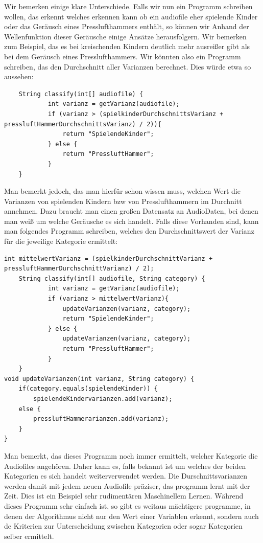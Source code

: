 \documentclass{thesisclass}
\begin{document}
Wir bemerken einige klare Unterschiede. Falls wir nun ein Programm schreiben wollen, das erkennt welches erkennen kann ob ein audiofile eher spielende Kinder oder das Geräusch eines Presslufthammers enthält, so können wir Anhand der Wellenfunktion dieser Geräusche einige Ansätze herausfolgern. Wir bemerken zum Beispiel, das es bei kreischenden Kindern deutlich mehr ausreißer gibt als bei dem Geräusch eines Presslufthammers. Wir könnten also ein Programm schreiben, das den Durchschnitt aller Varianzen berechnet.
Dies würde etwa so aussehen:
\newpage
\begin{lstlisting}
    String classify(int[] audiofile) {
        	int varianz = getVarianz(audiofile);
			if (varianz > (spielkinderDurchschnittsVarianz + pressluftHammerDurchschnittsVarianz) / 2)){
				return "SpielendeKinder";
			} else {
				return "PressluftHammer";
			}
    }   
\end{lstlisting}

Man bemerkt jedoch, das man hierfür schon wissen muss, welchen Wert die Varianzen von spielenden Kindern bzw von Presslufthammern im Durchnitt annehmen. Dazu braucht man einen großen Datensatz an AudioDaten, bei denen man weiß um welche Geräusche es sich handelt. Falls diese Vorhanden sind, kann man folgendes Programm schreiben, welches den Durchschnittswert der Varianz für die jeweilige Kategorie ermittelt:

\begin{lstlisting}
int mittelwertVarianz = (spielkinderDurchschnittVarianz + pressluftHammerDurchschnittVarianz) / 2);
    String classify(int[] audiofile, String category) {
        	int varianz = getVarianz(audiofile);
			if (varianz > mittelwertVarianz){
				updateVarianzen(varianz, category);				
				return "SpielendeKinder";
			} else {
				updateVarianzen(varianz, category);
				return "PressluftHammer";
			}
    }   
void updateVarianzen(int varianz, String category) {
	if(category.equals(spielendeKinder)) {
		spielendeKindervarianzen.add(varianz);
	else {
		pressluftHammerarianzen.add(varianz);
	}
}
\end{lstlisting}

Man bemerkt, das dieses Programm noch immer ermittelt, welcher Kategorie die Audiofiles angehören. Daher kann es, falls bekannt ist um welches der beiden Kategorien es sich handelt weiterverwendet werden. Die Durschnittsvarianzen werden damit mit jedem neuen Audiofile präziser, das programm lernt mit der Zeit. Dies ist ein Beispiel sehr rudimentären Maschinellem Lernen.\newline
Während dieses Programm sehr einfach ist, so gibt es weitaus mächtigere programme, in denen der Algorithmus nicht nur den Wert einer Variablen erkennt, sondern auch de Kriterien zur Unterscheidung zwischen Kategorien oder sogar Kategorien selber ermittelt.
\end{document}
